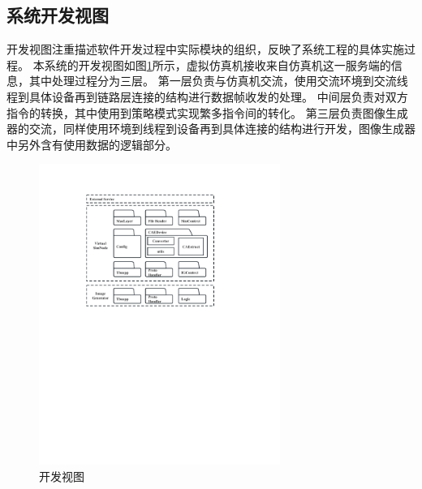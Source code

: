 \subsection{系统开发视图}
开发视图注重描述软件开发过程中实际模块的组织，反映了系统工程的具体实施过程。
本系统的开发视图如图\ref{dev}所示，虚拟仿真机接收来自仿真机这一服务端的信息，其中处理过程分为三层。
第一层负责与仿真机交流，使用交流环境到交流线程到具体设备再到链路层连接的结构进行数据帧收发的处理。
中间层负责对双方指令的转换，其中使用到策略模式实现繁多指令间的转化。
第三层负责图像生成器的交流，同样使用环境到线程到设备再到具体连接的结构进行开发，图像生成器中另外含有使用数据的逻辑部分。
\begin{figure}[h]
    \begin{center}
        \includegraphics[width=0.7\textwidth]{pictures/devdiagram.pdf}
        \caption{开发视图}
        \label{dev}
    \end{center}
\end{figure}
